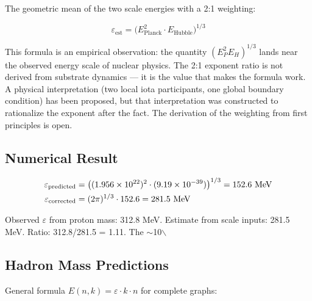 \documentclass[11pt,letterpaper]{article}
\begin{document}
The geometric mean of the two scale energies with a 2:1 weighting:

\begin{equation}
\varepsilon_\text{est} = \bigl(E_\text{Planck}^2 \cdot E_\text{Hubble}\bigr)^{1/3}
\end{equation}

This formula is an empirical observation: the quantity \((E_P^2 E_H)^{1/3}\) lands near the observed energy scale of nuclear physics. The 2:1 exponent ratio is not derived from substrate dynamics --- it is the value that makes the formula work. A physical interpretation (two local iota participants, one global boundary condition) has been proposed, but that interpretation was constructed to rationalize the exponent after the fact. The derivation of the weighting from first principles is open.

\subsection{Numerical Result}
\label{sec:org934fd92}

\begin{align}
\varepsilon_\text{predicted} &= \bigl((1.956\times10^{22})^2 \cdot (9.19\times10^{-39})\bigr)^{1/3} = 152.6\ \text{MeV} \notag\\
\varepsilon_\text{corrected} &= (2\pi)^{1/3} \cdot 152.6 = 281.5\ \text{MeV}
\end{align}

Observed \(\varepsilon\) from proton mass: 312.8 MeV. Estimate from scale inputs: 281.5 MeV. Ratio: 312.8/281.5 = 1.11. The \(\sim\)10$\backslash$%

\subsection{Hadron Mass Predictions}
\label{sec:org601ad51}

General formula \(E(n,k) = \varepsilon \cdot k \cdot n\) for complete graphs:
\end{document}
